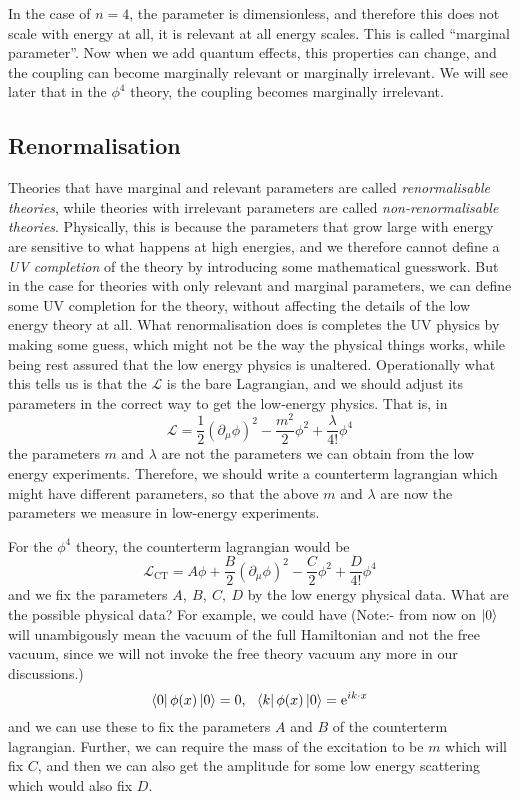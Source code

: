 \documentclass[11pt]{article}
\newcommand{\del}{\partial}
\newcommand{\e}{\mathrm{e}}
\newcommand{\ld}{\mathcal{L}}
\numberwithin{equation}{section}
\begin{document}
In the case of \(n=4\), the parameter is dimensionless, and therefore this does not scale with energy at all, it is relevant at all energy scales. This is called ``marginal parameter''. Now when we add quantum effects, this properties can change, and the coupling can become marginally relevant or marginally irrelevant. We will see later that in the \(\phi^4\) theory, the coupling becomes marginally irrelevant.

\subsection{Renormalisation}

Theories that have marginal and relevant parameters are called \textit{renormalisable theories}, while theories with irrelevant parameters are called \textit{non-renormalisable theories}. Physically, this is because the parameters that grow large with energy are sensitive to what happens at high energies, and we therefore cannot define a \textit{UV completion} of the theory by introducing some mathematical guesswork. But in the case for theories with only relevant and marginal parameters, we can define some UV completion for the theory, without affecting the details of the low energy theory at all. What renormalisation does is completes the UV physics by  making some guess, which might not be the way the physical things works, while being rest assured that the low energy physics is unaltered.
Operationally what this tells us is that the \(\ld\) is the bare Lagrangian, and we should adjust its parameters in the correct way to get the low-energy physics. That is, in 
\begin{equation*}
    \ld = \frac{1}{2}(\del_\mu \phi)^2 - \frac{m^2}{2}\phi^2 + \frac{\lambda}{4!}\phi^4
\end{equation*}
the parameters \(m\) and \(\lambda\) are not the parameters we can obtain from the low energy experiments. Therefore, we should write a counterterm lagrangian which might have different parameters, so that the above \(m\) and \(\lambda\) are now the parameters we measure in low-energy experiments. 

For the \(\phi^4\) theory, the counterterm lagrangian would be 
\begin{equation*}
    \ld_{\text{CT}} = A\phi + \frac{B}{2}(\del_\mu \phi)^2 - \frac{C}{2}\phi^2  + \frac{D}{4!}\phi^4
\end{equation*}
and we fix the parameters \(A,~B,~C,~D\) by the low energy physical data. What are the possible physical data? For example, we could have (Note:- from now on \(\ket{0}\) will unambigously mean the vacuum of the full Hamiltonian and not the free vacuum, since we will not invoke the free theory vacuum any more in our discussions.)
\begin{equation*}
    \bra{0}\phi(x)\ket{0} = 0,~~\bra{k}\phi(x)\ket{0} = \e^{ik\cdot x}
\end{equation*}
and we can use these to fix the parameters \(A\) and \(B\) of the counterterm lagrangian. Further, we can require the mass of the excitation to be \(m\) which will fix \(C\), and then we can also get the amplitude for some low energy scattering which would also fix \(D\).\\
\end{document}
